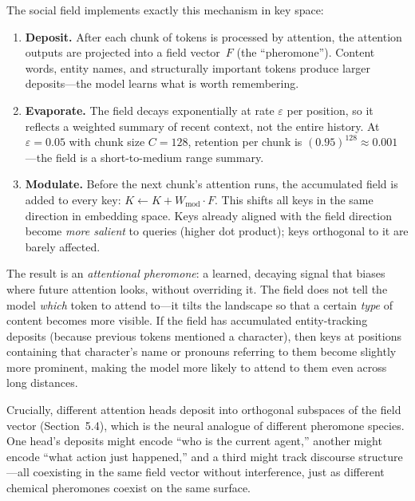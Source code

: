 \documentclass[11pt,a4paper]{article}
\begin{document}
The social field implements exactly this mechanism in key space:

\begin{enumerate}
    \item \textbf{Deposit.}  After each chunk of tokens is processed
          by attention, the attention outputs are projected into a
          field vector~$F$ (the ``pheromone'').  Content words, entity
          names, and structurally important tokens produce larger
          deposits---the model learns what is worth remembering.

    \item \textbf{Evaporate.}  The field decays exponentially at rate
          $\varepsilon$ per position, so it reflects a weighted summary
          of recent context, not the entire history.  At
          $\varepsilon = 0.05$ with chunk size $C = 128$, retention per
          chunk is $(0.95)^{128} \approx 0.001$---the field is a
          short-to-medium range summary.

    \item \textbf{Modulate.}  Before the next chunk's attention runs,
          the accumulated field is added to every key:
          $K \leftarrow K + W_{\text{mod}} \cdot F$.
          This shifts all keys in the same direction in embedding
          space.  Keys already aligned with the field direction become
          \emph{more salient} to queries (higher dot product); keys
          orthogonal to it are barely affected.
\end{enumerate}

The result is an \emph{attentional pheromone}: a learned, decaying
signal that biases where future attention looks, without overriding it.
The field does not tell the model \emph{which} token to attend to---it
tilts the landscape so that a certain \emph{type} of content becomes
more visible.  If the field has accumulated entity-tracking deposits
(because previous tokens mentioned a character), then keys at positions
containing that character's name or pronouns referring to them become
slightly more prominent, making the model more likely to attend to
them even across long distances.

Crucially, different attention heads deposit into orthogonal subspaces
of the field vector (Section~5.4), which is the neural analogue of
different pheromone species.  One head's deposits might encode
``who is the current agent,'' another might encode ``what action just
happened,'' and a third might track discourse structure---all
coexisting in the same field vector without interference, just as
different chemical pheromones coexist on the same surface.
\end{document}
